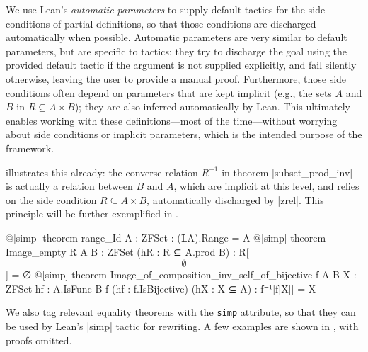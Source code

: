 We use Lean's \emph{automatic parameters} to supply default tactics for the side conditions of partial definitions, so that those conditions are discharged automatically when possible.
Automatic parameters are very similar to default parameters, but are specific to tactics: they try to discharge the goal using the provided default tactic if the argument is not supplied explicitly, and fail silently otherwise, leaving the user to provide a manual proof.
Furthermore, those side conditions often depend on parameters that are kept implicit (e.g., the sets $A$ and $B$ in $R \subseteq A \times B$); they are also inferred automatically by Lean.
This ultimately enables working with these definitions---most of the time---without worrying about side conditions or implicit parameters, which is the intended purpose of the \zflean{} framework.

 illustrates this already: the converse relation $R^{-1}$ in theorem \inlinelean|subset_prod_inv| is actually a relation between $B$ and $A$, which are implicit at this level, and relies on the side condition $R \subseteq A \times B$, automatically discharged by \inlinelean|zrel|.
This principle will be further exemplified in .
\begin{leanlisting}[title={Examples of simplification rules for relations and functions.}, label=lst:simp-rules, float=t]
@[simp] theorem range_Id {A : ZFSet} : (𝟙A).Range = A
@[simp] theorem Image_empty {R A B : ZFSet} (hR : R ⊆ A.prod B) : R[$$∅$$] = ∅
@[simp] theorem Image_of_composition_inv_self_of_bijective {f A B X : ZFSet}
  {hf : A.IsFunc B f} (hf : f.IsBijective) (hX : X ⊆ A) : f⁻¹[f[X]] = X
\end{leanlisting}
We also tag relevant equality theorems with the \texttt{simp} attribute, so that they can be used by Lean's \inlinelean|simp| tactic for rewriting.
A few examples are shown in , with proofs omitted.

